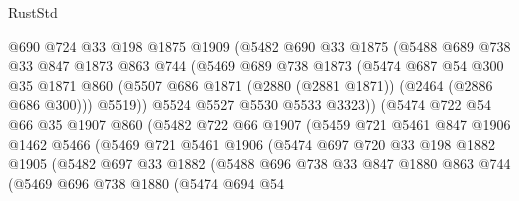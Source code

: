 \begin{lexlean}{RustStd}
\begin{coremodule}
                  @690
                  @724
                  @33
                  @198
                  @1875
                  @1909
                  (@5482
                    @690
                    @33
                    @1875
                    (@5488
                      @689
                      @738
                      @33
                      @847
                      @1873
                      @863
                      @744
                      (@5469
                        @689
                        @738
                        @1873
                        (@5474
                          @687
                          @54
                          @300
                          @35
                          @1871
                          @860
                          (@5507 @686 @1871 (@2880 (@2881 @1871)) (@2464 (@2886 @686 @300)))
                          @5519))
                      @5524
                      @5527
                      @5530
                      @5533
                      @3323))
                  (@5474
                    @722
                    @54
                    @66
                    @35
                    @1907
                    @860
                    (@5482
                      @722
                      @66
                      @1907
                      (@5459
                        @721
                        @5461
                        @847
                        @1906
                        @1462
                        @5466
                        (@5469
                          @721
                          @5461
                          @1906
                          (@5474
                            @697
                            @720
                            @33
                            @198
                            @1882
                            @1905
                            (@5482
                              @697
                              @33
                              @1882
                              (@5488
                                @696
                                @738
                                @33
                                @847
                                @1880
                                @863
                                @744
                                (@5469
                                  @696
                                  @738
                                  @1880
                                  (@5474
                                    @694
                                    @54

\end{coremodule}
\end{lexlean}
